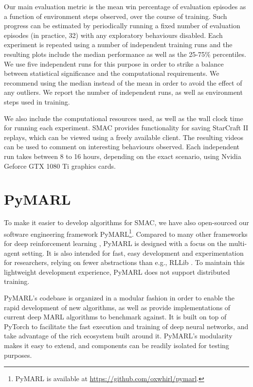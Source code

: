 \documentclass[twoside,11pt]{article}
\renewcommand{\cite}{\citep}
\begin{document}
Our main evaluation metric is the mean win percentage of evaluation episodes as a function of environment steps observed, over the course of training. 
Such progress can be estimated by periodically running a fixed number of evaluation episodes (in practice, 32) with any exploratory behaviours disabled. 
Each experiment is repeated using a number of independent training runs and the resulting plots include the median performance as well as the 25-75\% percentiles. 
We use five independent runs for this purpose in order to strike a balance between statistical significance and the computational requirements.
We recommend using the median instead of the mean in order to avoid the effect of any outliers. 
We report the number of independent runs, as well as environment steps used in training. 



We also include the computational resources used, as well as the wall clock time for running each experiment. SMAC provides functionality for saving StarCraft II replays, which can be viewed using a freely available client. The resulting videos can be used to comment on interesting behaviours observed. Each independent run takes between 8 to 16 hours, depending on the exact scenario, using Nvidia Geforce GTX 1080 Ti graphics cards.
 \section{PyMARL}
\label{sec:pymarl}

To make it easier to develop algorithms for SMAC, we have also open-sourced our 
software engineering framework PyMARL\footnote{PyMARL is available at 
\url{https://github.com/oxwhirl/pymarl}.}.
Compared to many other frameworks for deep reinforcement learning  
\citep{stooke2019rlpyt,stable-baselines,hoffman2020acme}, PyMARL is designed 
with a focus on the multi-agent setting.
It is also intended for fast, easy development and experimentation for 
researchers, relying on fewer abstractions than e.g., RLLib 
\cite{liang2018rllib}.
To maintain this lightweight development experience, PyMARL does not support 
distributed training.

PyMARL's codebase is organized in a modular fashion in order to enable the rapid development of new algorithms, as well as provide implementations of current deep MARL algorithms to benchmark against. It is built on top of PyTorch to facilitate the fast execution and training of deep neural networks, and take advantage of the rich ecosystem built around it. PyMARL's modularity makes it easy to extend, and components can be readily isolated for testing purposes.
\end{document}
